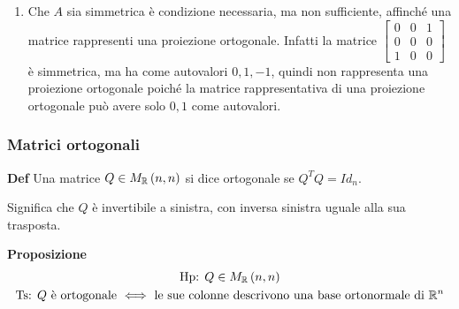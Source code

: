 \documentclass{article}
\begin{document}
\begin{enumerate}
\item Che $A$ sia simmetrica \`{e} condizione necessaria, ma non
sufficiente, affinch\'{e} una matrice rappresenti una proiezione ortogonale.
Infatti la matrice $\left[ 
\begin{array}{ccc}
0 & 0 & 1 \\ 
0 & 0 & 0 \\ 
1 & 0 & 0%
\end{array}%
\right] $ \`{e} simmetrica, ma ha come autovalori $0,1,-1$, quindi non
rappresenta una proiezione ortogonale poich\'{e} la matrice rappresentativa
di una proiezione ortogonale pu\`{o} avere solo $0,1$ come autovalori.

\end{enumerate}

\subsubsection{Matrici ortogonali}

\textbf{Def} Una matrice $Q\in M_{%
\mathbb{R}
}\left( n,n\right) $ si dice ortogonale se $Q^{T}Q=Id_{n}$.

Significa che $Q$ \`{e} invertibile a sinistra, con inversa sinistra uguale
alla sua trasposta.

\textbf{Proposizione}%
\begin{gather*}
\text{Hp}\text{: }Q\in M_{%
\mathbb{R}
}\left( n,n\right) \\
\text{Ts}\text{: }Q\text{ \`{e} ortogonale }\Longleftrightarrow \text{ le
sue colonne descrivono una base ortonormale di }%
\mathbb{R}
^{n}
\end{gather*}
\end{document}
